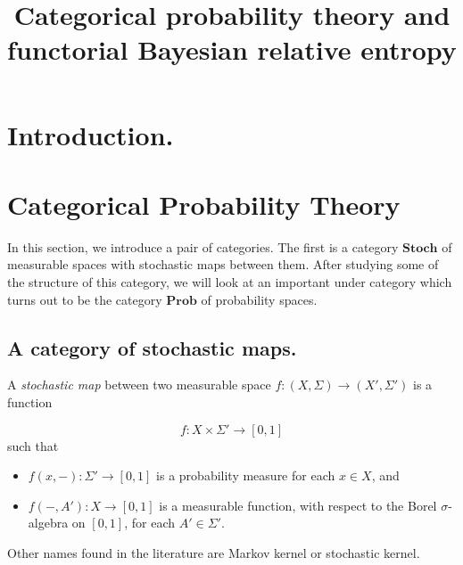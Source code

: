\documentclass[11pt]{amsart}
\newcommand{\cat}[1]{\mathbf{#1}}
\newcommand{\from}{\colon}
\theoremstyle{remark}
\theoremstyle{definition}
\begin{document}
	\title{Categorical probability theory and functorial Bayesian relative entropy}
	\maketitle
	
	\tableofcontents

%
\section{Introduction.}
%


\section{Categorical Probability Theory}

In this section, we introduce a pair of 
categories.  The first is a category 
$\cat{Stoch}$ of measurable spaces with 
stochastic maps between them.  After studying 
some of the structure of this category, we 
will look at an important under category which 
turns out to be the category $\cat{Prob}$ of 
probability spaces.  

\subsection{A category of stochastic maps.}
A \emph{stochastic map} between two measurable 
space $f \from (X,\Sigma) \to (X',\Sigma')$ is 
a function

\[
	f \from X \times \Sigma' \to [0,1]
\]
such that 
\begin{itemize}
		\item $f(x,-) \from \Sigma' \to [0,1]$ is a probability measure for each $x \in X$, and 
		\item  $f(-,A') \from X \to [0,1]$ is a measurable function, with respect to the Borel $\sigma$-algebra on $[0,1]$, for each $A' \in \Sigma'$.
\end{itemize}
Other names found in the literature are Markov 
kernel or stochastic kernel.
\end{document}
